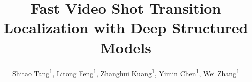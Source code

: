 \documentclass[runningheads]{llncs}
\begin{document}
\pagestyle{headings}
\mainmatter


\def\ACCV18SubNumber{538}  

\title{Fast Video Shot Transition Localization with Deep Structured Models} 




\author{Shitao Tang\textsuperscript{1}, Litong Feng\textsuperscript{1}, Zhanghui Kuang\textsuperscript{1}, Yimin Chen\textsuperscript{1}, Wei Zhang\textsuperscript{1}} 

\maketitle
\end{document}
